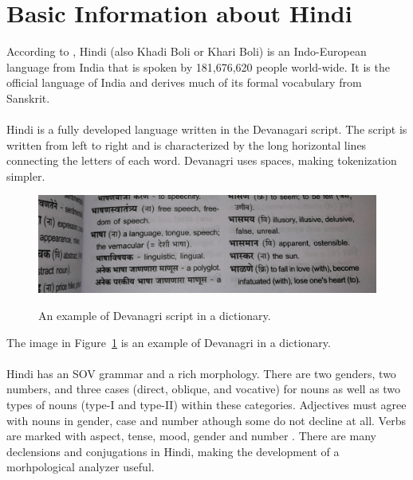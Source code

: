 \documentclass[11pt,letterpaper]{article}
\begin{document}
\section{Basic Information about Hindi}
According to \cite{ethnologue}, Hindi (also Khadi Boli or Khari Boli) is an Indo-European language from India that is spoken by 181,676,620 people world-wide. It is the official language of India and derives much of its formal vocabulary from Sanskrit. \\
\\
Hindi is a fully developed language written in the Devanagari script. The script is written from left to right and is characterized by the long horizontal lines connecting the letters of each word. Devanagri uses spaces, making tokenization simpler.
\begin{figure}[h]
  \caption{An example of Devanagri script in a dictionary.}
  \centering
  \includegraphics[scale=0.15]{devanagri.jpg}
  \label{script}
\end{figure}
The image in Figure~\ref{script} is an example of Devanagri in a dictionary. \\
\\
Hindi has an SOV grammar and a rich morphology. There are two genders, two numbers, and three cases (direct, oblique, and vocative) for nouns as well as two types of nouns (type-I and type-II) within these categories. Adjectives must agree with nouns in gender, case and number athough some do not decline at all. Verbs are marked with aspect, tense, mood, gender and number \cite{snell}. There are many declensions and conjugations in Hindi, making the development of a morhpological analyzer useful.
\end{document}
